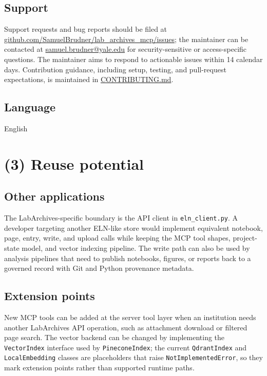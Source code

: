 \documentclass{josr}
\begin{document}
\subsection*{Support}
Support requests and bug reports should be filed at \href{https://github.com/SamuelBrudner/lab_archives_mcp/issues}{github.com/SamuelBrudner/lab\_archives\_mcp/issues}; the maintainer can be contacted at \href{mailto:samuel.brudner@yale.edu}{samuel.brudner@yale.edu} for security-sensitive or access-specific questions. The maintainer aims to respond to actionable issues within 14 calendar days. Contribution guidance, including setup, testing, and pull-request expectations, is maintained in \href{https://github.com/SamuelBrudner/lab_archives_mcp/blob/main/CONTRIBUTING.md}{CONTRIBUTING.md}.

\subsection*{Language}
English

\section*{(3) Reuse potential}
\subsection*{Other applications}
The LabArchives-specific boundary is the API client in \texttt{eln\_client.py}. A developer targeting another ELN-like store would implement equivalent notebook, page, entry, write, and upload calls while keeping the MCP tool shapes, project-state model, and vector indexing pipeline. The write path can also be used by analysis pipelines that need to publish notebooks, figures, or reports back to a governed record with Git and Python provenance metadata.

\subsection*{Extension points}
New MCP tools can be added at the server tool layer when an institution needs another LabArchives API operation, such as attachment download or filtered page search. The vector backend can be changed by implementing the \texttt{VectorIndex} interface used by \texttt{PineconeIndex}; the current \texttt{QdrantIndex} and \texttt{LocalEmbedding} classes are placeholders that raise \texttt{NotImplementedError}, so they mark extension points rather than supported runtime paths.
\end{document}
